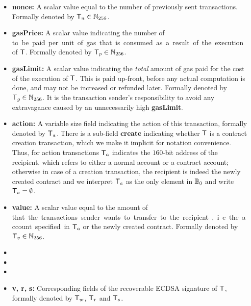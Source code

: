 \begin{itemize} [nosep]
	\item {\bf nonce:} A scalar value equal to the number of previously sent transactions. Formally denoted by $\textsf{T}_n \in\mathbb{N}_{256}$.

	\item {\bf gasPrice:} A scalar value indicating the number of \unit to be paid per unit of gas that is consumed as a result of the execution of $\textsf{T}$. Formally denoted by $\textsf{T}_p\in\mathbb{N}_{256}$.

	\item {\bf gasLimit:} A scalar value indicating the \emph{total} amount of gas paid for the cost of the execution of $\textsf{T}$. This is paid up-front, before any actual computation is done, and may not be increased or refunded later. 
	Formally denoted by $\textsf{T}_g\in\mathbb{N}_{256}$.
	It is the transaction sender's responsibility to avoid any extravagance caused by an unnecessarily high {\bf gasLimit}.

	\item {\bf action:} 
	A variable size field indicating the action of this transaction, formally denoted by $\textsf{T}_a$. 
	There is a sub-field {\bf create} indicating whether $\textsf{T}$ is a contract creation transaction, which we make it implicit for notation convenience. 
	Thus, for action transactions $\textsf{T}_a$ indicates the $160$-bit address of the recipient, which refers to either a normal account or a contract account;
	otherwise in case of a creation transaction, the recipient is indeed the newly created contract and we interpret $\textsf{T}_a$ as the only element in $\mathbb{B}_0$ and write $\textsf{T}_a = \emptyset$.

	\item {\bf value:} A scalar value equal to the amount of \unit that the transactions sender wants to transfer to the recipient, i.e. the account specified in $\textsf{T}_a$ or the newly created contract.
	Formally denoted by $\textsf{T}_v\in\mathbb{N}_{256}$.


	\item {}

	\item {}

	\item {} 

	\item {\bf v, r, s:} Corresponding fields of the recoverable ECDSA signature of $\textsf{T}$, formally denoted by $\textsf{T}_w$, $\textsf{T}_r$ and $\textsf{T}_s$. 
\end{itemize}

